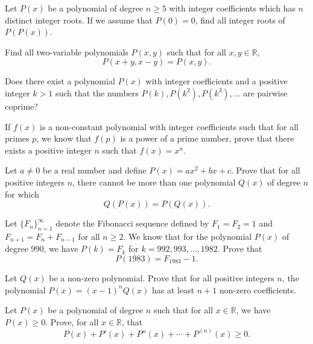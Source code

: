 \documentclass[12pt,a4paper]{memoir}
\theoremstyle{definition}
\begin{document}
\begin{question}[name={1998 Czech And Slovak}]
	Let $P(x)$ be a polynomial of degree $n\geq 5$ with integer coefficients which has $n$ distinct integer roots. If we assume that $P(0)=0$, find all integer roots of $P(P(x))$.
\end{question}

\begin{question}[name={1998 Russia}]
	Find all two-variable polynomials $P(x,y)$ such that for all $x,y\in\mathbb R$,
	\[P(x+y,x-y)=P(x,y).\]
\end{question}



\begin{question}[name={1998 Russia}]
	Does there exist a polynomial $P(x)$ with integer coefficients and a positive integer $k>1$ such that the numbers $P(k), P(k^2), P(k^3),\dots$ are pairwise coprime?
\end{question}


\begin{question}
	If $f(x)$ is a non-constant polynomial with integer coefficients such that for all primes $p$, we know that $f(p)$ is a power of a prime number, prove that there exists a positive integer $n$ such that $f(x)=x^n$.
\end{question}

\begin{question}[name={1979 Hungary}]
	Let $a\neq 0$ be a real number and define $P(x)=ax^2+bx+c$. Prove that for all positive integers $n$, there cannot be more than one polynomial $Q(x)$ of degree $n$ for which
	\[Q(P(x))=P(Q(x)).\]
\end{question}


\begin{question}[name={1983 Romania}]
	Let $\{F_n\}_{n=1}^\infty$ denote the Fibonacci sequence defined by $F_1=F_2=1$ and $F_{n+1}=F_n + F_{n-1}$ for all $n\geq 2$. We know that for the polynomial $P(x)$ of degree $990$, we have $P(k)=F_k$ for $k=992,993,\dots,1982$. Prove that \[P(1983)=F_{1983}-1.\]
\end{question}

\begin{question}[name={1977 Bulgaria}]
	Let $Q(x)$ be a non-zero polynomial. Prove that for all positive integers $n$, the polynomial $P(x)=(x-1)^nQ(x)$ has at least $n+1$ non-zero coefficients.
\end{question}

\begin{question}[name={1985 Sweden}]
	Let $P(x)$ be a polynomial of degree $n$ such that for all $x\in\mathbb R$, we have $P(x) \geq 0$. Prove, for all $x\in \mathbb R$, that
	\[P(x) + P'(x) + P''(x) + \cdots + P^{(n)}(x) \geq 0.\]
\end{question}
\end{document}

